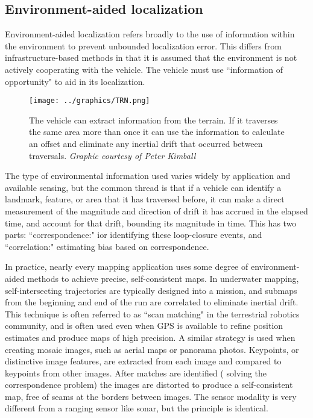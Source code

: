 \subsection{Environment-aided localization}

Environment-aided localization refers broadly to the use of information within the environment to prevent unbounded localization error. This differs from infrastructure-based methods in that it is assumed that the environment is not actively cooperating with the vehicle. The vehicle must use ``information of opportunity" to aid in its localization. 

\begin{figure}[htbp]
   \centering
   \texttt{[image: ../graphics/TRN.png]} %
   \caption{The vehicle can extract information from the terrain. If it traverses the same area more than once it can use the information to calculate an offset and eliminate any inertial drift that occurred between traversals. \emph{Graphic courtesy of Peter Kimball}}
   \label{fig:TRN}
\end{figure}

The type of environmental information used varies widely by application and available sensing, but the common thread is that if a vehicle can identify a landmark, feature, or area that it has traversed before, it can make a direct measurement of the magnitude and direction of drift it has accrued in the elapsed time, and account for that drift, bounding its magnitude in time. This has two parts: ``correspondence:" ior identifying these loop-closure events, and ``correlation:" estimating bias based on correspondence. 

In practice, nearly every mapping application uses some degree of environment-aided methods to achieve precise, self-consistent maps. In underwater mapping, self-intersecting trajectories are typically designed into a mission, and submaps from the beginning and end of the run are correlated to eliminate inertial drift. This technique is often referred to as ``scan matching" in the terrestrial robotics community, and is often used even when GPS is available to refine position estimates and produce maps of high precision. A similar strategy is used when creating mosaic images, such as aerial maps or panorama photos.  Keypoints, or distinctive image features, are extracted from each image and compared to keypoints from other images. After matches are identified ( solving the correspondence problem) the images are distorted to produce a self-consistent map, free of seams at the borders between images. The sensor modality is very different from a ranging sensor like sonar, but the principle is identical. 

